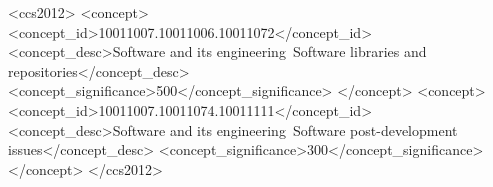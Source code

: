 \documentclass[sigconf,screen,review,anonymous]{acmart}
\begin{document}
\begin{CCSXML}
<ccs2012>
    <concept>
        <concept_id>10011007.10011006.10011072</concept_id>
        <concept_desc>Software and its engineering~Software libraries and repositories</concept_desc>
        <concept_significance>500</concept_significance>
        </concept>
    <concept>
        <concept_id>10011007.10011074.10011111</concept_id>
        <concept_desc>Software and its engineering~Software post-development issues</concept_desc>
        <concept_significance>300</concept_significance>
    </concept>
</ccs2012>
\end{CCSXML}
  





\maketitle
\end{document}
